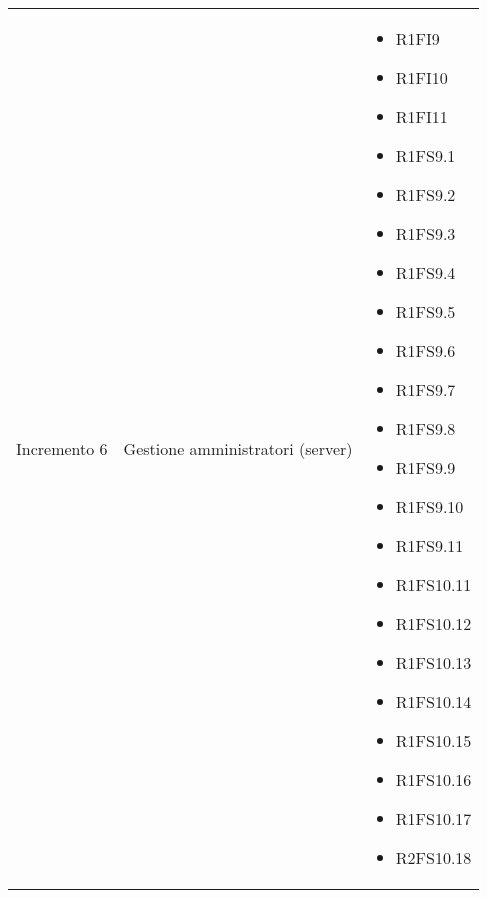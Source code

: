 {\begin{longtable}{C{4cm} C{6cm} C{4cm}}
Incremento 6 & Gestione amministratori (server) & \begin{itemize}
    \item[ ] R1FI9
    \item[ ] R1FI10
    \item[ ] R1FI11
    \item[ ] R1FS9.1
    \item[ ] R1FS9.2
    \item[ ] R1FS9.3
    \item[ ] R1FS9.4
    \item[ ] R1FS9.5
    \item[ ] R1FS9.6
    \item[ ] R1FS9.7
    \item[ ] R1FS9.8
    \item[ ] R1FS9.9
    \item[ ] R1FS9.10
    \item[ ] R1FS9.11
    \item[ ] R1FS10.11
    \item[ ] R1FS10.12
    \item[ ] R1FS10.13
    \item[ ] R1FS10.14
    \item[ ] R1FS10.15
    \item[ ] R1FS10.16
    \item[ ] R1FS10.17
    \item[ ] R2FS10.18
\end{itemize}\\

\end{longtable}
}